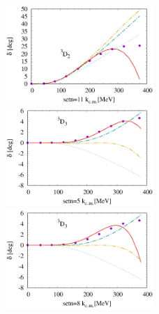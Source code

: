 \documentclass{article}
\begin{document}
\begin{figure}[htbp]
\includegraphics[width=0.5\textwidth]{11_3d2.eps}
\includegraphics[width=0.5\textwidth]{5_3d3.eps}
\includegraphics[width=0.5\textwidth]{8_3d3.eps}
\end{figure}
\end{document}
